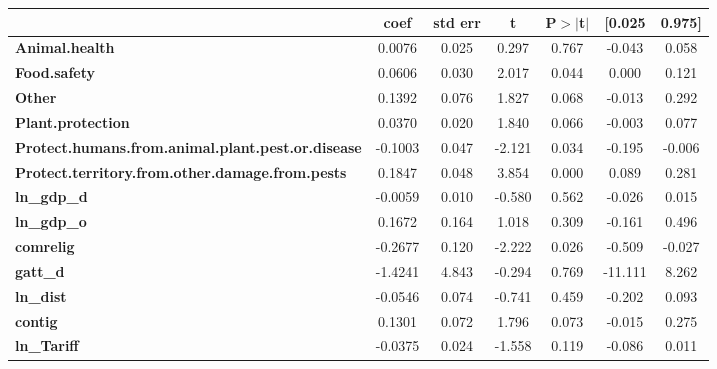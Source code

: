 \begin{center}
\begin{tabular}{lcccccc}
                                                          & \textbf{coef} & \textbf{std err} & \textbf{t} & \textbf{P$> |$t$|$} & \textbf{[0.025} & \textbf{0.975]}  \\
\midrule
\textbf{Animal.health}                                    &       0.0076  &        0.025     &     0.297  &         0.767        &       -0.043    &        0.058     \\
\textbf{Food.safety}                                      &       0.0606  &        0.030     &     2.017  &         0.044        &        0.000    &        0.121     \\
\textbf{Other}                                            &       0.1392  &        0.076     &     1.827  &         0.068        &       -0.013    &        0.292     \\
\textbf{Plant.protection}                                 &       0.0370  &        0.020     &     1.840  &         0.066        &       -0.003    &        0.077     \\
\textbf{Protect.humans.from.animal.plant.pest.or.disease} &      -0.1003  &        0.047     &    -2.121  &         0.034        &       -0.195    &       -0.006     \\
\textbf{Protect.territory.from.other.damage.from.pests}   &       0.1847  &        0.048     &     3.854  &         0.000        &        0.089    &        0.281     \\
\textbf{ln\_gdp\_d}                                       &      -0.0059  &        0.010     &    -0.580  &         0.562        &       -0.026    &        0.015     \\
\textbf{ln\_gdp\_o}                                       &       0.1672  &        0.164     &     1.018  &         0.309        &       -0.161    &        0.496     \\
\textbf{comrelig}                                         &      -0.2677  &        0.120     &    -2.222  &         0.026        &       -0.509    &       -0.027     \\
\textbf{gatt\_d}                                          &      -1.4241  &        4.843     &    -0.294  &         0.769        &      -11.111    &        8.262     \\
\textbf{ln\_dist}                                         &      -0.0546  &        0.074     &    -0.741  &         0.459        &       -0.202    &        0.093     \\
\textbf{contig}                                           &       0.1301  &        0.072     &     1.796  &         0.073        &       -0.015    &        0.275     \\
\textbf{ln\_Tariff}                                       &      -0.0375  &        0.024     &    -1.558  &         0.119        &       -0.086    &        0.011     \\
\bottomrule
\end{tabular}
\end{center}